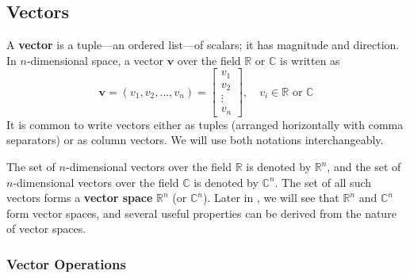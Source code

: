 \subsection{Vectors}
A \textbf{vector} is a tuple---an ordered list---of scalars; it has magnitude and direction. In $ n $-dimensional space, a vector $ \mathbf{v} $ over the field $ \mathbb{R} $ or $ \mathbb{C} $ is written as
\begin{equation*}
    \mathbf{v} = (v_1, v_2, \ldots, v_n) = \begin{bmatrix} v_1 \\ v_2 \\ \vdots \\ v_n \end{bmatrix}, \quad v_i \in \mathbb{R} \text{ or } \mathbb{C}
\end{equation*}
It is common to write vectors either as tuples (arranged horizontally with comma separators) or as column vectors. We will use both notations interchangeably.

The set of $n$-dimensional vectors over the field $ \mathbb{R} $ is denoted by $ \mathbb{R}^n $, and the set of $n$-dimensional vectors over the field $ \mathbb{C} $ is denoted by $ \mathbb{C}^n $.
The set of all such vectors forms a \textbf{vector space} $ \mathbb{R}^n $ (or $ \mathbb{C}^n $).
Later in , we will see that $\mathbb{R}^n$ and $\mathbb{C}^n$ form vector spaces, and several useful properties can be derived from the nature of vector spaces.

\subsubsection{Vector Operations}
